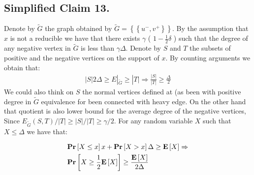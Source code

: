 \subsection{Simplified Claim 13.} 
\newcommand{\Gtt}{\tilde{G}}
Denote by $\Gtt$ the graph obtained by $\Gtt  = \left\{ \left\{ u^{-}, v^{+} \right\}  \right\} $. By the assumption that $x$ is not a reducible we have that there exists $\gamma$ ( $ 1- \frac{1}{2}\delta$  )  such that the degree of any negative vertex in $\Gtt$ is less than $\gamma\Delta$. Denote by $S$ and $T$ the subsets of positive and the negative vertices on the support of $x$. By counting arguments we obtain that: 
\begin{equation*}
  \begin{split}
    |S| 2\Delta \ge E|_{\Gtt} \ge  |T| \Rightarrow \frac{|S|}{|T|} \ge \frac{\Delta}{2}
  \end{split}
\end{equation*}
We could also think on $S$ the normal vertices defined at \cite{leverrier2022quantum} (as been with positive degree in $\Gtt$ equivalence for been connected with heavy edge. On the other hand that quotient is also lower bound for the average degree of the negative vertices, Since $E_{\Gtt}(S,T)/|T| \ge |S|/|T| \ge \gamma/2$. For any random variable $X$ such that $X \le \Delta$ we have that: 

  \begin{equation*}
    \begin{split}
      & \mathbf{Pr} \left[ {X\le x} \right]x+\mathbf{Pr} \left[ {X > x} \right]\Delta\ge \mathbf{E} \left[ {X} \right]\Rightarrow \\ 
      & \mathbf{Pr} \left[ {X \ge \frac{1}{2} \mathbf{E} \left[ {X} \right] } \right] \ge \frac{\mathbf{E} \left[ {X} \right]}{2\Delta}
    \end{split}
  \end{equation*}

